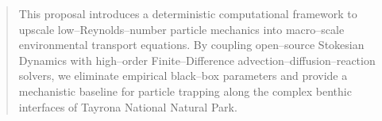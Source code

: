 \begin{abstract}
This proposal introduces a deterministic computational framework to upscale low--Reynolds--number particle mechanics into macro--scale environmental transport equations. By coupling open--source Stokesian Dynamics with high--order Finite--Difference advection--diffusion--reaction solvers, we eliminate empirical black--box parameters and provide a mechanistic baseline for particle trapping along the complex benthic interfaces of Tayrona National Natural Park.
\end{abstract}
